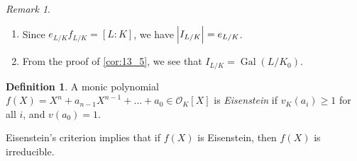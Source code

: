 \documentclass[11pt]{article}
\theoremstyle{definition}
\newtheorem{definition}{Definition}[subsection]
\theoremstyle{plain}
\theoremstyle{remark}
\newtheorem*{remark}{Remark}
\DeclareMathOperator{\Gal}{Gal}
\newcommand{\cO}{\mathcal{O}}
\begin{document}
\begin{remark}\phantom{}
    \begin{enumerate}
        \item Since $e_{L/K} f_{L/K} = [L:K]$, we have $\abs{I_{L/K}} = e_{L/K}$.
        \item From the proof of \autoref{cor:13_5}, we see that $I_{L/K} = \Gal(L/K_0)$.
    \end{enumerate}
\end{remark}

\begin{definition}\label{def:13_7}
    A monic polynomial $f(X) = X^n + a_{n-1} X^{n-1} + \ldots + a_0 \in \cO_K[X]$ is \emph{Eisenstein} if $v_K(a_i) \ge 1$ for all $i$, and $v(a_0) = 1$.
\end{definition}

Eisenstein's criterion implies that if $f(X)$ is Eisenstein, then $f(X)$ is irreducible.
\end{document}
